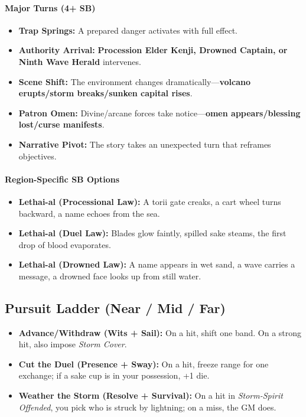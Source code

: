 \paragraph{Major Turns (4+ SB)}
\begin{itemize}
\item \textbf{Trap Springs:} A prepared danger activates with full effect.
\item \textbf{Authority Arrival:} \textbf{Procession Elder Kenji, Drowned Captain, or Ninth Wave Herald} intervenes.
\item \textbf{Scene Shift:} The environment changes dramatically---\textbf{volcano erupts/storm breaks/sunken capital rises}.
\item \textbf{Patron Omen:} Divine/arcane forces take notice---\textbf{omen appears/blessing lost/curse manifests}.
\item \textbf{Narrative Pivot:} The story takes an unexpected turn that reframes objectives.
\end{itemize}

\paragraph{Region-Specific SB Options}
\begin{itemize}
\item \textbf{Lethai-al (Processional Law):} A torii gate creaks, a cart wheel turns backward, a name echoes from the sea.
\item \textbf{Lethai-al (Duel Law):} Blades glow faintly, spilled sake steams, the first drop of blood evaporates.
\item \textbf{Lethai-al (Drowned Law):} A name appears in wet sand, a wave carries a message, a drowned face looks up from still water.
\end{itemize}

\subsection*{Pursuit Ladder (Near / Mid / Far)}
\begin{itemize}
\item \textbf{Advance/Withdraw (Wits + Sail):} On a hit, shift one band. On a strong hit, also impose \emph{Storm Cover}.
\item \textbf{Cut the Duel (Presence + Sway):} On a hit, freeze range for one exchange; if a sake cup is in your possession, +1 die.
\item \textbf{Weather the Storm (Resolve + Survival):} On a hit in \emph{Storm-Spirit Offended}, you pick who is struck by lightning; on a miss, the GM does.
\end{itemize}

